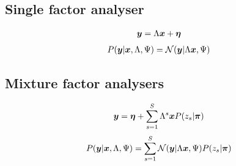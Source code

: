 \documentclass[a4paper]{article}
\begin{document}
\subsection{Single factor analyser}
\begin{align}
  \boldsymbol{y}=\Lambda\boldsymbol{x}+\boldsymbol{\eta}
\end{align}
\begin{align}
  P(\boldsymbol{y}|\boldsymbol{x},\Lambda,\Psi)=\mathcal{N}(\boldsymbol{y}|\Lambda\boldsymbol{x},\Psi)
\end{align}

\subsection{Mixture factor analysers}
\begin{align}
  \boldsymbol{y}=\boldsymbol{\eta}+\sum_{s=1}^S\Lambda^s\boldsymbol{x} P(z_s|\boldsymbol{\pi})
\end{align}
\begin{align}
  P(\boldsymbol{y}|\boldsymbol{x},\Lambda,\Psi)=\sum_{s=1}^S\mathcal{N}(\boldsymbol{y}|\Lambda\boldsymbol{x},\Psi)P(z_s|\boldsymbol{\pi})
\end{align}

\newpage
\end{document}
